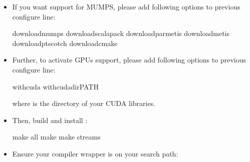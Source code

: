 \documentclass[letterpaper,10pt,english]{sphinxmanual}
\begin{document}
\begin{itemize}
\item {} 
If you want support for MUMPS, please add following options to previous configure line:

\begin{sphinxVerbatim}[commandchars=\\\{\}]
\PYGZdl{} \PYGZhy{}\PYGZhy{}download\PYGZhy{}mumps \PYGZhy{}\PYGZhy{}download\PYGZhy{}scalapack \PYGZhy{}\PYGZhy{}download\PYGZhy{}parmetis \PYGZhy{}\PYGZhy{}download\PYGZhy{}metis \PYGZhy{}\PYGZhy{}download\PYGZhy{}ptscotch \PYGZhy{}\PYGZhy{}download\PYGZhy{}cmake
\end{sphinxVerbatim}

\item {} 
Further, to activate GPUs support, please add following options to previous configure line:

\begin{sphinxVerbatim}[commandchars=\\\{\}]
\PYGZdl{} \PYGZhy{}\PYGZhy{}with\PYGZhy{}cuda \PYGZhy{}\PYGZhy{}with\PYGZus{}cuda\PYGZus{}dirPATH
\end{sphinxVerbatim}

where  is the directory of your CUDA libraries.

\item {} 
Then, build and install :

\begin{sphinxVerbatim}[commandchars=\\\{\}]
\PYGZdl{} make   all
\PYGZdl{} make   
\PYGZdl{} make   streams
\end{sphinxVerbatim}

\item {} 
Ensure your  compiler wrapper is on your search path:

\begin{sphinxVerbatim}[commandchars=\\\{\}]
\PYGZdl{}  
\end{sphinxVerbatim}


\end{itemize}
\end{document}
